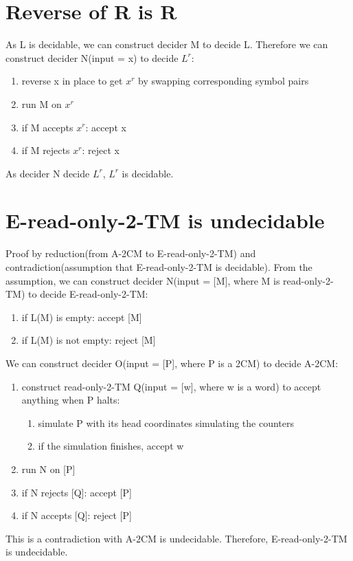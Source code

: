 \documentclass{article}
\begin{document}
\section{Reverse of R is R}
As L is decidable, we can construct decider M to decide L. Therefore we can construct decider N(input = x) to decide $ L^r $:
\begin{enumerate}
	\item reverse x in place to get $ x^r $ by swapping corresponding symbol pairs
	\item run M on $ x^r $
	\item if M accepts $ x^r $: accept x
	\item if M rejects $ x^r $: reject x
\end{enumerate}
As decider N decide $ L^r $, $ L^r $ is decidable.

\section{E-read-only-2-TM is undecidable}
Proof by reduction(from A-2CM to E-read-only-2-TM) and contradiction(assumption that E-read-only-2-TM is decidable). From the assumption, we can construct decider N(input = [M], where M is read-only-2-TM) to decide E-read-only-2-TM:
\begin{enumerate}
	\item if L(M) is empty: accept [M]
	\item if L(M) is not empty: reject [M]
\end{enumerate}
We can construct decider O(input = [P], where P is a 2CM) to decide A-2CM:
\begin{enumerate}
	\item construct read-only-2-TM Q(input = [w], where w is a word) to accept anything when P halts:
	\begin{enumerate}
		\item simulate P with its head coordinates simulating the counters
		\item if the simulation finishes, accept w
	\end{enumerate}
	\item run N on [P]
	\item if N rejects [Q]: accept [P]
	\item if N accepts [Q]: reject [P]
\end{enumerate}
This is a contradiction with A-2CM is undecidable. Therefore, E-read-only-2-TM is undecidable.
\end{document}
